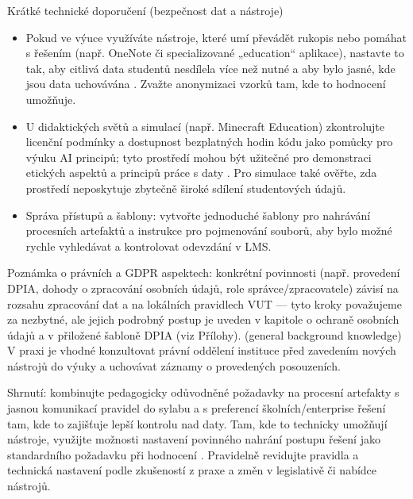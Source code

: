 Krátké technické doporučení (bezpečnost dat a nástroje)
\begin{itemize}
  \item Pokud ve výuce využíváte nástroje, které umí převádět rukopis nebo pomáhat s řešením (např. OneNote či specializované „education“ aplikace), nastavte to tak, aby citlivá data studentů nesdílela více než nutné a aby bylo jasné, kde jsou data uchovávána \cite{kb_ai_101_tipu_pdf_04e4a115_page_8_1,kb_ai_101_tipu_pdf_04e4a115_page_14_1}. Zvažte anonymizaci vzorků tam, kde to hodnocení umožňuje.
  \item U didaktických světů a simulací (např. Minecraft Education) zkontrolujte licenční podmínky a dostupnost bezplatných hodin kódu jako pomůcky pro výuku AI principů; tyto prostředí mohou být užitečné pro demonstraci etických aspektů a principů práce s daty \cite{kb_ai_101_tipu_pdf_04e4a115_page_15_2}. Pro simulace také ověřte, zda prostředí neposkytuje zbytečně široké sdílení studentových údajů.
  \item Správa přístupů a šablony: vytvořte jednoduché šablony pro nahrávání procesních artefaktů a instrukce pro pojmenování souborů, aby bylo možné rychle vyhledávat a kontrolovat odevzdání v LMS.
\end{itemize}

Poznámka o právních a GDPR aspektech: konkrétní povinnosti (např. provedení DPIA, dohody o zpracování osobních údajů, role správce/zpracovatele) závisí na rozsahu zpracování dat a na lokálních pravidlech VUT — tyto kroky považujeme za nezbytné, ale jejich podrobný postup je uveden v kapitole o ochraně osobních údajů a v přiložené šabloně DPIA (viz Přílohy). (general background knowledge) V praxi je vhodné konzultovat právní oddělení instituce před zavedením nových nástrojů do výuky a uchovávat záznamy o provedených posouzeních.

Shrnutí: kombinujte pedagogicky odůvodněné požadavky na procesní artefakty s jasnou komunikací pravidel do sylabu a s preferencí školních/enterprise řešení tam, kde to zajišťuje lepší kontrolu nad daty. Tam, kde to technicky umožňují nástroje, využijte možnosti nastavení povinného nahrání postupu řešení jako standardního požadavku při hodnocení \cite{kb_ai_101_tipu_pdf_04e4a115_page_8_1}. Pravidelně revidujte pravidla a technická nastavení podle zkušeností z praxe a změn v legislativě či nabídce nástrojů.